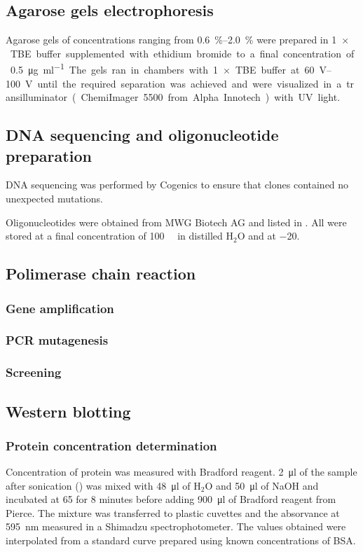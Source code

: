   \subsection{Agarose gels electrophoresis}
    Agarose gels of concentrations ranging from \SIrange{0.6}{2.0}{\percent} were prepared in \SI{1}{$\times$} TBE
    buffer supplemented with ethidium bromide to a final concentration of \SI{0.5}{\ug\per\ml}.
    The gels ran in chambers with \SI{1}{$\times$} TBE buffer at \SIrange{60}{100}{\volt} until the required
    separation was achieved and were visualized in a transilluminator (ChemiImager 5500 from Alpha Innotech) with UV light.

  \subsection{DNA sequencing and oligonucleotide preparation}
    DNA sequencing was performed by Cogenics to ensure that clones contained no
    unexpected mutations.
    
    Oligonucleotides were obtained from MWG Biotech AG and listed in .
    All were stored at a final concentration of \SI{100}{\micro\Molar} in distilled H$_2$O
    and at \SI{-20}{\dc}.

  \subsection{Polimerase chain reaction}
    \subsubsection{Gene amplification}
    \subsubsection{PCR mutagenesis}
    \subsubsection{Screening}

  \subsection{Western blotting}
    \subsubsection{Protein concentration determination}
      Concentration of protein was measured with Bradford reagent. \SI{2}{\ul} of the
      sample after sonication () was mixed with \SI{48}{\ul} of H$_2$O
      and \SI{50}{\ul} of NaOH and incubated at \SI{65}{\dc} for 8 minutes before adding
      \SI{900}{\ul} of Bradford reagent from Pierce. The mixture was transferred to plastic
      cuvettes and the absorvance at \SI{595}{\nm} measured in a Shimadzu spectrophotometer. The
      values obtained were interpolated from a standard curve prepared using known concentrations
      of BSA.
    
